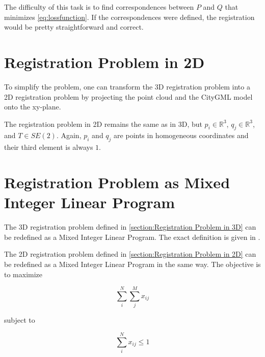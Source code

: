         The difficulty of this task is to find correspondences between $P$ and $Q$ that minimizes \autoref{eq:lossfunction}.
        If the correspondences were defined, the registration would be pretty straightforward and correct.

    \section{Registration Problem in 2D}
    \label{section:Registration Problem in 2D}
        To simplify the problem, one can transform the 3D registration problem into a 2D registration problem 
        by projecting the point cloud and the CityGML model onto the xy-plane.

        The registration problem in 2D remains the same as in 3D, but $p_i \in \mathbb{R}^{3}$, $q_j \in \mathbb {R}^{3}$, and $T \in SE(2)$.
        Again, $p_i$ and $q_j$ are points in homogeneous coordinates and their third element is always $1$.

    \section{Registration Problem as Mixed Integer Linear Program}
    \label{section:Registration Problem as Mixed Integer Linear Program}
        The 3D registration problem defined in \autoref{section:Registration Problem in 3D} can be redefined as a Mixed Integer Linear Program.
        The exact definition is given in \cite{Sakakubara_2007_automatic}.

        The 2D registration problem defined in \autoref{section:Registration Problem in 2D} can be redefined as a Mixed Integer Linear Program in the same way.
        The objective is to maximize
        
        \begin{equation}
            \label{eq:objective_original}
            \sum_{i}^{N} \sum_{j}^{M} x_{ij}    
        \end{equation}
        
        subject to
        
        \begin{equation}
            \label{eq:subject_sum_rows}
            \sum_{i}^{N} x_{ij} \leq 1
        \end{equation}
        

